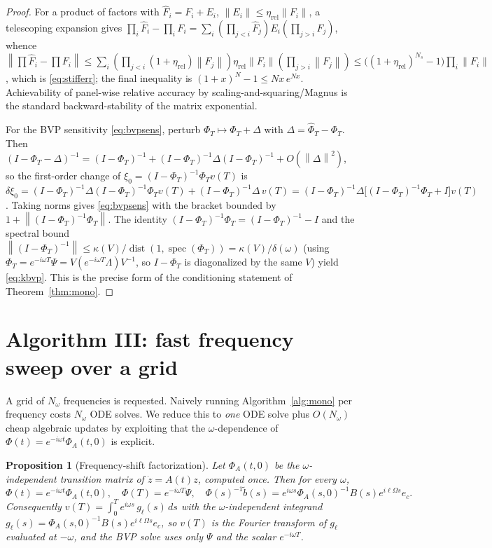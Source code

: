 \documentclass{amsart}
\newtheorem{proposition}{Proposition}
\theoremstyle{definition}
\DeclareMathOperator{\spec}{spec}
\DeclareMathOperator{\dist}{dist}
\newcommand{\norm}[1]{\left\lVert#1\right\rVert}
\begin{document}
\begin{proof}
For a product of factors with $\hat F_i=F_i+E_i$, $\norm{E_i}\le\eta_{\mathrm{rel}}\norm{F_i}$,
a telescoping expansion gives
$\prod_i\hat F_i-\prod_i F_i=\sum_i(\prod_{j<i}\hat F_j)E_i(\prod_{j>i}F_j)$,
whence
$\norm{\prod\hat F_i-\prod F_i}\le\sum_i(\prod_{j<i}(1+\eta_{\mathrm{rel}})\norm{F_j})
\eta_{\mathrm{rel}}\norm{F_i}(\prod_{j>i}\norm{F_j})
\le\big((1+\eta_{\mathrm{rel}})^{N_s}-1\big)\prod_i\norm{F_i}$,
which is \eqref{eq:stifferr}; the final inequality is
$(1+x)^N-1\le Nx\,e^{Nx}$. Achievability of panel-wise relative accuracy by
scaling-and-squaring/Magnus is the standard backward-stability of the matrix
exponential.

For the BVP sensitivity \eqref{eq:bvpsens}, perturb $\Phi_T\mapsto\Phi_T+\Delta$
with $\Delta=\hat\Phi_T-\Phi_T$. Then $(I-\Phi_T-\Delta)^{-1}
=(I-\Phi_T)^{-1}+(I-\Phi_T)^{-1}\Delta(I-\Phi_T)^{-1}+O(\norm\Delta^2)$, so the
first-order change of $\xi_0=(I-\Phi_T)^{-1}\Phi_T v(T)$ is
$\delta\xi_0=(I-\Phi_T)^{-1}\Delta(I-\Phi_T)^{-1}\Phi_T v(T)
+(I-\Phi_T)^{-1}\Delta\,v(T)
=(I-\Phi_T)^{-1}\Delta\big[(I-\Phi_T)^{-1}\Phi_T+I\big]v(T)$.
Taking norms gives \eqref{eq:bvpsens} with the bracket bounded by
$1+\norm{(I-\Phi_T)^{-1}\Phi_T}$. The identity
$(I-\Phi_T)^{-1}\Phi_T=(I-\Phi_T)^{-1}-I$ and the spectral bound
$\norm{(I-\Phi_T)^{-1}}\le\kappa(V)/\dist(1,\spec(\Phi_T))=\kappa(V)/\delta(\omega)$
(using $\Phi_T=e^{-i\omega T}\Psi=V(e^{-i\omega T}\Lambda)V^{-1}$, so $I-\Phi_T$
is diagonalized by the same $V$) yield \eqref{eq:kbvp}. This is the precise form
of the conditioning statement of Theorem~\ref{thm:mono}.
\end{proof}

\section{Algorithm III: fast frequency sweep over a grid}\label{sec:lift}

A grid of $N_\omega$ frequencies is requested. Naively running
Algorithm~\ref{alg:mono} per frequency costs $N_\omega$ ODE solves. We reduce
this to \emph{one} ODE solve plus $O(N_\omega)$ cheap algebraic updates by
exploiting that the $\omega$-dependence of $\Phi(t)=e^{-i\omega t}\Phi_A(t,0)$ is
explicit.

\begin{proposition}[Frequency-shift factorization]\label{prop:shift}
Let $\Phi_A(t,0)$ be the $\omega$-independent transition matrix of
$\dot z=A(t)z$, computed once. Then for every $\omega$,
\begin{equation}\label{eq:shift}
\Phi(t)=e^{-i\omega t}\Phi_A(t,0),\quad
\Phi(T)=e^{-i\omega T}\Psi,\quad
\Phi(s)^{-1}\tilde b(s)=e^{i\omega s}\Phi_A(s,0)^{-1}B(s)e^{i\ell\Omega s}e_c .
\end{equation}
Consequently $v(T)=\int_0^T e^{i\omega s}\,g_\ell(s)\,ds$ with the
$\omega$-independent integrand $g_\ell(s)=\Phi_A(s,0)^{-1}B(s)e^{i\ell\Omega s}e_c$,
so $v(T)$ is the Fourier transform of $g_\ell$ evaluated at $-\omega$, and the
BVP solve uses only $\Psi$ and the scalar $e^{-i\omega T}$.
\end{proposition}
\end{document}
